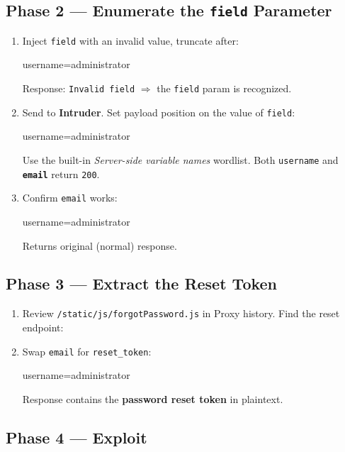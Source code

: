 \documentclass[11pt]{article}
\begin{document}
\subsection{Phase 2 --- Enumerate the \texttt{field} Parameter}

\begin{enumerate}
  \item Inject \texttt{field} with an invalid value, truncate after:
\begin{httpbox}[]
username=administrator%
\end{httpbox}
  Response: \texttt{Invalid field} $\Rightarrow$ the \texttt{field} param is recognized.

  \item Send to \textbf{Intruder}. Set payload position on the value of \texttt{field}:
\begin{httpbox}[]
username=administrator%
\end{httpbox}
  Use the built-in \textit{Server-side variable names} wordlist. Both \texttt{username} and \textbf{\texttt{email}} return \texttt{200}.

  \item Confirm \texttt{email} works:
\begin{httpbox}[]
username=administrator%
\end{httpbox}
  Returns original (normal) response.
\end{enumerate}

\subsection{Phase 3 --- Extract the Reset Token}

\begin{enumerate}
  \item Review \texttt{/static/js/forgotPassword.js} in Proxy history. Find the reset endpoint:

  \item Swap \texttt{email} for \texttt{reset\_token}:
\begin{httpbox}[]
username=administrator%
\end{httpbox}
  Response contains the \textbf{password reset token} in plaintext.
\end{enumerate}

\subsection{Phase 4 --- Exploit}
\end{document}

